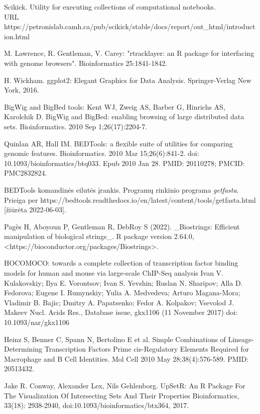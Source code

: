 \documentclass[12pt]{article}
\begin{document}
\begin{thebibliography}{99}
Scikick. Utility for executing collections of computational
notebooks.\\
URL https://petronislab.camh.ca/pub/scikick/stable/docs/report/out\_html/introduction.html

 M. Lawrence, R. Gentleman, V. Carey: "rtracklayer: an {R}
package for interfacing with genome browsers". Bioinformatics 25:1841-1842.

 H. Wickham. ggplot2: Elegant Graphics for Data Analysis.
Springer-Verlag New York, 2016.

 BigWig and BigBed tools: Kent WJ, Zweig AS, Barber G,
Hinrichs AS, Karolchik D. BigWig and BigBed: enabling browsing of large
distributed data sets. Bioinformatics. 2010 Sep 1;26(17):2204-7.

 Quinlan AR, Hall IM. BEDTools: a flexible suite of
utilities for comparing genomic features. Bioinformatics. 2010 Mar
15;26(6):841-2. doi: 10.1093/bioinformatics/btq033. Epub 2010 Jan 28.
PMID: 20110278; PMCID: PMC2832824.

 BEDTools komandinės eilutės įrankis. Programų rinkinio
programa \emph{getfasta}.\\
Prieiga per https://bedtools.readthedocs.io/en/latest/content/tools/getfasta.html
[žiūrėta 2022-06-03].

 Pagès H, Aboyoun P, Gentleman R, DebRoy S (2022). \_Biostrings:
Efficient manipulation of biological strings\_. R package version
2.64.0, <https://bioconductor.org/packages/Biostrings>.

 HOCOMOCO: towards a complete collection of transcription
factor binding models for human and mouse via large-scale ChIP-Seq analysis
Ivan V. Kulakovskiy; Ilya E. Vorontsov; Ivan S. Yevshin; Ruslan N. Sharipov;
Alla D. Fedorova; Eugene I. Rumynskiy; Yulia A. Medvedeva; Arturo Magana-Mora;
Vladimir B. Bajic; Dmitry A. Papatsenko; Fedor A. Kolpakov; Vsevolod J. Makeev
Nucl. Acids Res., Database issue, gkx1106 (11 November 2017)
doi: 10.1093/nar/gkx1106

 Heinz S, Benner C, Spann N, Bertolino E et al. Simple
Combinations of Lineage-Determining Transcription Factors Prime cis-Regulatory
Elements Required for Macrophage and B Cell Identities. Mol Cell 2010 May
28;38(4):576-589. PMID: 20513432.

 Jake R. Conway, Alexander Lex, Nils Gehlenborg. UpSetR: An R
Package For The Visualization Of Intersecting Sets And Their Properties
Bioinformatics, 33(18): 2938-2940, doi:10.1093/bioinformatics/btx364, 2017.


\end{thebibliography}
\end{document}
